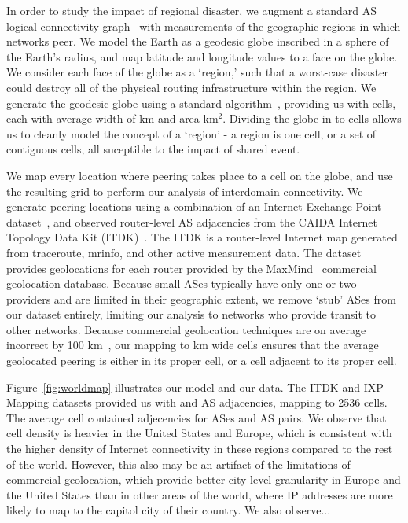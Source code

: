     In order to study the impact of regional disaster, we augment a standard AS logical connectivity graph~\cite{caida-asgraph} with measurements of the geographic regions in which networks peer.
    We model the Earth as a geodesic globe inscribed in a sphere of the Earth's radius, and map latitude and longitude values to a face on the globe.
    We consider each face of the globe as a `region,' such that a worst-case disaster could destroy all of the physical routing infrastructure within the region.
    We generate the geodesic globe using a standard algorithm~\cite{geodesic}, providing us with   cells, each with average width of km and area  km$^2$.  
    Dividing the globe in to cells allows us to cleanly model the concept of a `region' - a region is one cell, or a set of contiguous cells, all suceptible to the impact of shared event. 
     
    We map every location where peering takes place to a cell on the globe, and use the resulting grid to perform our analysis of interdomain connectivity.
    We generate peering locations using a combination of an Internet Exchange Point dataset~\cite{ixps-mapped}, and observed router-level AS adjacencies from the CAIDA Internet Topology Data Kit (ITDK)~\cite{itdk}.
    The ITDK is a router-level Internet map generated from traceroute, mrinfo, and other active measurement data.
    The dataset provides geolocations for each router provided by the MaxMind~\cite{maxmind} commercial geolocation database.
    Because small ASes typically have only one or two providers and are limited in their geographic extent, we remove `stub' ASes from our dataset entirely, limiting our analysis to networks who provide transit to other networks.
    Because commercial geolocation techniques are on average incorrect by 100 km~\cite{someone}, our mapping to  km wide cells ensures that the average geolocated peering is either in its proper cell, or a cell adjacent to its proper cell.
    
    
    Figure~\ref{fig:worldmap} illustrates our model and our data.
    The ITDK and IXP Mapping datasets provided us with  and  AS adjacencies, mapping to 2536 cells.
    The average cell contained adjecencies for  ASes and  AS pairs.
    We observe that cell density is heavier in the United States and Europe, which is consistent with the higher density of Internet connectivity in these regions compared to the rest of the world.
    However, this also may be an artifact of the limitations of commercial geolocation, which provide better city-level granularity in Europe and the United States than in other areas of the world, where IP addresses are more likely to map to the capitol city of their country.
    We also observe... 

